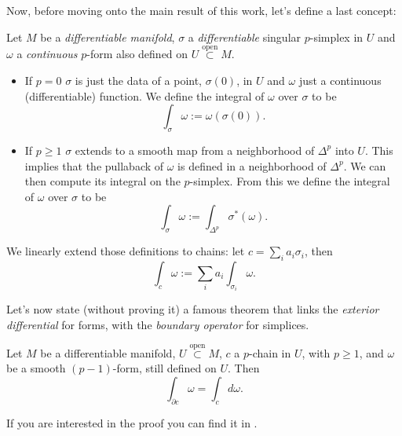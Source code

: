 Now, before moving onto the main result of this work, let's define a last concept:
\begin{defn}
	Let $M$ be a \textit{differentiable manifold}, $\sigma$ a \textit{differentiable} singular $p$-simplex in $U$ and $\omega$ a \textit{continuous} $p$-form also defined on $U \stackrel{\text{open}}{\subset} M$.
	\begin{itemize}
		\item If $p = 0$ $\sigma$ is just the data of a point, $\sigma(0)$, in $U$ and $\omega$ just a continuous (differentiable) function.
			We define the integral of $\omega$ over $\sigma$ to be
			\begin{equation}
				\int_{\sigma}^{} \omega := \omega(\sigma(0)) 
			.\end{equation} 
		\item If $p \geq 1$ $\sigma$ extends to a smooth map from a neighborhood of $\Delta^p$ into $U$.
			This implies that the pullaback of $\omega$ is defined in a neighborhood of $\Delta^p$.
			We can then compute its integral on the $p$-simplex.
			From this we define the integral of $\omega$ over $\sigma$ to be
			\begin{equation}
				\int_{\sigma}^{} \omega := \int_{\Delta^p}^{} \sigma^*(\omega)  
			.\end{equation} 
	\end{itemize} 
	We linearly extend those definitions to chains:
	let $c = \sum_{i}^{}a_i \sigma_i$, then
	\begin{equation}
	\int_{c}^{} \omega := \sum_{i}^{} a_i \int_{\sigma_i}^{} \omega  
	.\end{equation} 
\end{defn}
Let's now state (without proving it) a famous theorem that links the \textit{exterior differential} for forms, with the \textit{boundary operator} for simplices.

\begin{thm}
	Let $M$ be a differentiable manifold, $U \stackrel{\text{open}}{\subset} M$, $c$ a $p$-chain in $U$, with $p \geq 1$, and $\omega$ be a smooth $(p-1)$-form, still defined on $U$.
	Then
	\begin{equation}
	\int_{\partial c}^{} \omega = \int_{c}^{} d\omega
	.\end{equation} 
\end{thm}
If you are interested in the proof you can find it in \cite[\S 4.7]{warner}.

